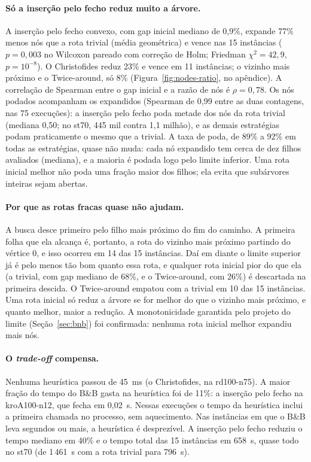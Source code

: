 \paragraph{Só a inserção pelo fecho reduz muito a árvore.} A inserção pelo fecho
convexo, com gap inicial mediano de 0,9\%, expande 77\% menos nós que a rota trivial
(média geométrica) e vence nas 15 instâncias ($p = 0{,}003$ no Wilcoxon pareado com
correção de Holm; Friedman $\chi^2 = 42{,}9$, $p = 10^{-8}$). O Christofides reduz 23\% e
vence em 11 instâncias; o vizinho mais próximo e o Twice-around, só 8\%
(Figura~\ref{fig:nodes-ratio}, no apêndice). A correlação de Spearman entre o gap inicial e a razão de
nós é $\rho = 0{,}78$. Os nós podados acompanham os expandidos (Spearman de 0,99 entre as
duas contagens, nas 75 execuções): a inserção pelo fecho poda metade dos nós da rota
trivial (mediana 0,50; no st70, 445 mil contra 1,1 milhão), e as demais estratégias
podam praticamente o mesmo que a trivial. A taxa de poda, de 89\% a 92\% em todas as
estratégias, quase não muda: cada nó expandido tem cerca de dez filhos avaliados
(mediana), e a maioria é podada logo pelo limite inferior. Uma rota inicial melhor não poda uma fração maior dos
filhos; ela evita que subárvores inteiras sejam abertas.

\paragraph{Por que as rotas fracas quase não ajudam.} A busca desce primeiro pelo filho
mais próximo do fim do caminho. A primeira folha que ela alcança é, portanto, a rota do
vizinho mais próximo partindo do vértice 0, e isso ocorreu em 14 das 15 instâncias. Daí
em diante o limite superior já é pelo menos tão bom quanto essa rota, e qualquer rota
inicial pior do que ela (a trivial, com gap mediano de 68\%, e o Twice-around, com 26\%)
é descartada na primeira descida. O Twice-around empatou com a trivial em 10 das 15
instâncias. Uma rota inicial só reduz a árvore se for melhor do que o vizinho mais
próximo, e quanto melhor, maior a redução. A monotonicidade garantida pelo projeto do
limite (Seção~\ref{sec:bnb}) foi confirmada: nenhuma rota inicial melhor expandiu mais nós.

\paragraph{O \emph{trade-off} compensa.} Nenhuma heurística passou de 45~ms (o
Christofides, na rd100-n75). A maior fração do tempo do B\&B gasta na heurística foi de
11\%: a inserção pelo fecho na kroA100-n12, que fecha em 0,02~s. Nessas execuções o tempo
da heurística inclui a primeira chamada no processo, sem aquecimento. Nas instâncias em
que o B\&B leva segundos ou mais, a heurística é desprezível. A inserção pelo fecho
reduziu o tempo mediano em 40\% e o tempo total das 15 instâncias em 658~s, quase todo no
st70 (de 1\,461~s com a rota trivial para 796~s).


